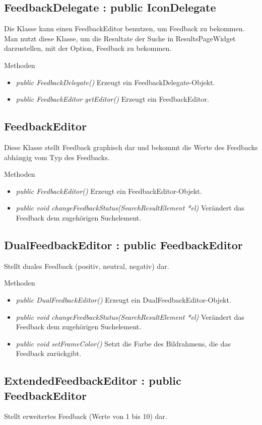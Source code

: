 \subsection*{FeedbackDelegate : public IconDelegate}
Die Klasse kann einen FeedbackEditor benutzen, um Feedback zu bekommen. Man nutzt diese Klasse, um die Resultate der Suche in ResultsPageWidget darzustellen, mit der Option, Feedback zu bekommen. 

Methoden
\begin{itemize}
	\item\textit{public FeedbackDelegate()}
	Erzeugt ein FeedbackDelegate-Objekt.
	\item\textit{public FeedbackEditor getEditor()}
	Erzeugt ein FeedbackEditor.
\end{itemize}

\subsection*{FeedbackEditor}
Diese Klasse stellt Feedback graphisch dar und bekommt die Werte des Feedbacks abhängig vom Typ des Feedbacks.

Methoden
\begin{itemize}
	\item\textit{public FeedbackEditor()}
	Erzeugt ein FeedbackEditor-Objekt.
	\item\textit{public void changeFeedbackStatus(SearchResultElement *el)}
	Verändert das Feedback dem zugehörigen Suchelement.
\end{itemize}

\subsection*{DualFeedbackEditor : public FeedbackEditor}
Stellt duales Feedback (positiv, neutral, negativ) dar.

Methoden
\begin{itemize}
	\item\textit{public DualFeedbackEditor()}
	Erzeugt ein DualFeedbackEditor-Objekt.
	\item\textit{public void changeFeedbackStatus(SearchResultElement *el)}
	Verändert das Feedback dem zugehörigen Suchelement.
	\item\textit{public void setFrameColor()}
	Setzt die Farbe des Bildrahmens, die das Feedback zurückgibt. 
\end{itemize}

\subsection*{ExtendedFeedbackEditor : public FeedbackEditor}
Stellt erweitertes Feedback (Werte von 1 bis 10) dar.

